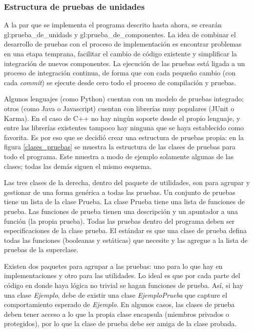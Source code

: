 %
%
%

\subsubsection{Estructura de pruebas de unidades}

A la par que se implementa el programa descrito hasta ahora, se crearán
\glspl{gl:prueba_de_unidad} y \glspl{gl:prueba_de_componente}. La idea de
combinar el desarrollo de pruebas con el proceso de implementación es encontrar
problemas en una etapa temprana, facilitar el cambio de código existente y
simplificar la integración de nuevos componentes. La ejecución de las pruebas
está ligada a un proceso de integración continua, de forma que con
cada pequeño cambio (con cada \textit{commit}) se ejecute desde cero todo el
proceso de compilación y pruebas.

Algunos lenguajes (como Python) cuentan con un modelo de pruebas integrado;
otros (como Java o Javascript) cuentan con librerías muy populares (JUnit o
Karma). En el caso de C++ no hay ningún soporte desde el propio lenguaje, y
entre las librerías existentes tampoco hay ninguna que se haya establecido como
favorita. Es por eso que se decidió crear una estructura de pruebas propia:
en la figura \ref{clases_pruebas} se muestra la estructura de las clases de
pruebas para todo el programa. Este muestra a modo de ejemplo solamente algunas
de las clases; todas las demás siguen el mismo esquema.

Las tres clases de la derecha, dentro del paquete de utilidades, son para
agrupar y gestionar de una forma genérica a todas las pruebas. Un conjunto de
pruebas tiene un lista de la clase Prueba. La clase Prueba tiene una lista de
funciones de prueba. Las funciones de prueba tienen una descripción y un
apuntador a una función (la propia prueba). Todas las pruebas dentro del
programa deben ser especificaciones de la clase prueba. El estándar es que una
clase de prueba defina todas las funciones (booleanas y estáticas) que necesite
y las agregue a la lista de pruebas de la superclase.

Existen dos paquetes para agrupar a las pruebas: uno para lo que hay en
implementaciones y otro para las utilidades. Lo ideal es que por cada parte del
código en donde haya lógica no trivial se hagan funciones de prueba. Así, si hay
una clase \textit{Ejemplo}, debe de existir una clase \textit{EjemploPrueba}
que capture el comportamiento esperado de \textit{Ejemplo}. En algunos casos,
las clases de prueba deben tener acceso a lo que la propia clase encapsula
(miembros privados o protegidos), por lo que la clase de prueba debe ser amiga
de la clase probada.

